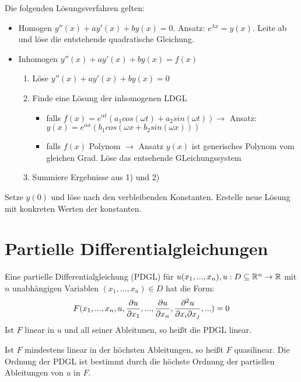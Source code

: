 \begin{satz}
	Die folgenden Lösungsverfahren gelten:
	
	\begin{itemize}
		\item Homogen $y''(x) + a y'(x) + b y(x) = 0$. Ansatz: $e^{\lambda x} = y(x)$. Leite ab und löse die entstehende quadratische Gleichung.
		\item Inhomogen $y''(x) + a y'(x) + b y(x) = f(x) $
		\begin{enumerate} [noitemsep]
			\item Löse $y''(x) + a y'(x) + b y(x) = 0$
			\item Finde eine Lösung der inhomogenen LDGL 
			\begin{itemize}
				\item falls $f(x) = e^{\alpha t} (a_1 cos(\omega t) + a_2 sin(\omega t)) \rightarrow $ Ansatz: $y(x) = e^{\alpha x} (b_1 cos(\omega x + b_2 sin(\omega x)))$
				\item falls $f(x)$ Polynom $\rightarrow$ Ansatz $y(x)$ ist generisches Polynom vom gleichen Grad. Löse das entsehende GLeichungssystem
			\end{itemize}
			\item Summiere Ergebnisse aus 1) und 2)
		\end{enumerate}
	\end{itemize}
\end{satz}

\begin{definition}[Anfangswertproblem]
	Setze $y(0)$ und löse nach den verbleibenden Konstanten. Erstelle neue Lösung mit konkreten Werten der konstanten.
\end{definition}

\pagebreak

\section{Partielle Differentialgleichungen}

\begin{definition}
	Eine partielle Differentialgleichung (PDGL) für $u(x_1,...,x_n), u : D \subseteq \mathbb{R}^n \rightarrow \mathbb{R} $ mit $n$ unabhängigen Variablen $(x_1,...,x_n) \in D$ hat die Form:
	\begin{align*}
		F(x_1,...,x_n,u,\frac{\partial u}{\partial x_1},...,\frac{\partial u}{\partial x_n},\frac{\partial ^2u}{\partial x_i \partial x_j},...) = 0
	\end{align*}
	Ist $F$ linear in $u$ und all seiner Ableitunen, so heißt die PDGL linear.
	
	 Ist $F$ mindestens linear in der höchsten Ableitungen, so heißt $F$ quasilinear.
	 Die Ordnung der PDGL ist bestimmt durch die höchste Ordnung der partiellen Ableitungen von $u$ in $F$.
\end{definition}

